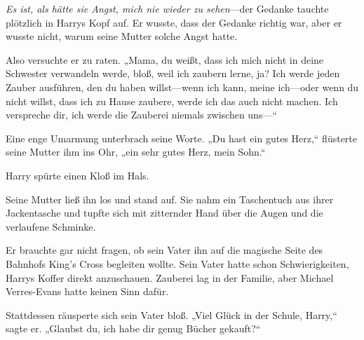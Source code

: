 \emph{Es ist, als hätte sie Angst, mich nie wieder zu sehen}—der Gedanke tauchte plötzlich in Harrys Kopf auf. Er wusste, dass der Gedanke richtig war, aber er wusste nicht, warum seine Mutter solche Angst hatte.

Also versuchte er zu raten. „Mama, du weißt, dass ich mich nicht in deine Schwester verwandeln werde, bloß, weil ich zaubern lerne, ja? Ich werde jeden Zauber ausführen, den du haben willst—wenn ich kann, meine ich—oder wenn du nicht willst, dass ich zu Hause zaubere, werde ich das auch nicht machen. Ich verspreche dir, ich werde die Zauberei niemals zwischen uns—“

Eine enge Umarmung unterbrach seine Worte. „Du hast ein gutes Herz,“ flüsterte seine Mutter ihm ins Ohr, „ein sehr gutes Herz, mein Sohn.“

Harry spürte einen Kloß im Hals.

Seine Mutter ließ ihn los und stand auf. Sie nahm ein Taschentuch aus ihrer Jackentasche und tupfte sich mit zitternder Hand über die Augen und die verlaufene Schminke.

Er brauchte gar nicht fragen, ob sein Vater ihn auf die magische Seite des Bahnhofs King's Cross begleiten wollte. Sein Vater hatte schon Schwierigkeiten, Harrys Koffer direkt anzuschauen. Zauberei lag in der Familie, aber Michael Verres-Evans hatte keinen Sinn dafür.

Stattdessen räusperte sich sein Vater bloß. „Viel Glück in der Schule, Harry,“ sagte er. „Glaubst du, ich habe dir genug Bücher gekauft?“

